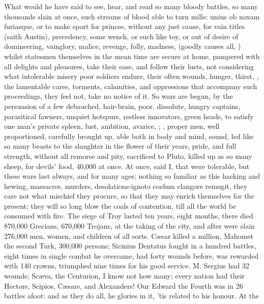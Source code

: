 {What would he have said to see, hear, and read so many bloody battles,
so many thousands slain at once, such streams of blood able to turn
mills: unius ob noxam furiasque, or to make sport for princes, without
any just cause, for vain titles (saith Austin), precedency, some
wench, or such like toy, or out of desire of domineering, vainglory,
malice, revenge, folly, madness, (goodly causes all, ) whilst statesmen themselves in the
mean time are secure at home, pampered with all delights and pleasures,
take their ease, and follow their lusts, not considering what
intolerable misery poor soldiers endure, their often wounds, hunger,
thirst, \etc{}, the lamentable cares, torments, calamities, and
oppressions that accompany such proceedings, they feel not, take no
notice of it. So wars are begun, by the persuasion of a few debauched,
hair-brain, poor, dissolute, hungry captains, parasitical fawners,
unquiet hotspurs, restless innovators, green heads, to satisfy one
man's private spleen, lust, ambition, avarice, \etc{}; , proper men, well
proportioned, carefully brought up, able both in body and mind, sound,
led like so many beasts to the slaughter in the flower of their
years, pride, and full strength, without all remorse and pity,
sacrificed to Pluto, killed up as so many sheep, for devils' food,
40,000 at once. At once, said I, that were tolerable, but these wars
last always, and for many ages; nothing so familiar as this hacking and
hewing, massacres, murders, desolations-ignoto coelum clangore remugit,
they care not what mischief they procure, so that they may enrich
themselves for the present; they will so long blow the coals of
contention, till all the world be consumed with fire. The siege of
Troy lasted ten years, eight months, there died 870,000 Grecians,
670,000 Trojans, at the taking of the city, and after were slain
276,000 men, women, and children of all sorts. C\ae{}sar killed a million,
Mahomet the second Turk, 300,000 persons; Sicinius Dentatus fought
in a hundred battles, eight times in single combat he overcame, had
forty wounds before, was rewarded with 140 crowns, triumphed nine times
for his good service. M. Sergius had 32 wounds; Sc\ae{}va, the Centurion,
I know not how many; every nation had their Hectors, Scipios, C\ae{}sars,
and Alexanders! Our Edward the Fourth was in 26 battles afoot: and
as they do all, he glories in it, 'tis related to his honour. At the
}
